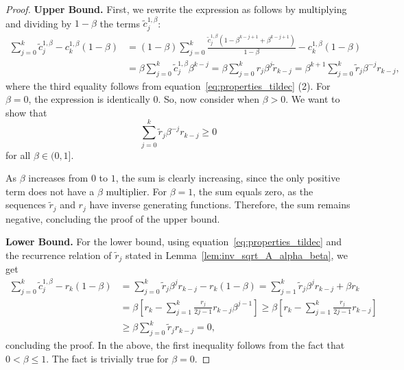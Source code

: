 \documentclass{article} %
\renewcommand{\paragraph}[1]{\noindent\textbf{#1}\quad}
\begin{document}
\begin{proof}
\paragraph{Upper Bound.} First, we rewrite the expression as follows by multiplying and dividing by $1-\beta$ the terms $\tilde{c}^{1, \beta}_j$:
\begin{equation}
\begin{aligned}
     \sum\limits_{j =0}^{k} \tilde{c}^{1, \beta}_j - c_k^{1, \beta} (1 - \beta) &= (1 -\beta)\sum\limits_{j = 0}^{k}\frac{\tilde{c}^{1, \beta}_j(1 -\beta^{k-j + 1} + \beta^{k - j + 1})}{1 - \beta} -c_k^{1, \beta}(1 - \beta)\\ 
     &= \beta \sum\limits_{j = 0}^{k}\tilde{c}^{1, \beta}_j\beta^{k-j}  =\beta\sum\limits_{j = 0}^{k} r_{j}\beta^{j} \tilde{r}_{k - j} =  \beta^{k + 1}\sum\limits_{j = 0}^{k} \tilde{r}_{j}\beta^{-j} r_{k - j},
\end{aligned}
\end{equation}
where the third equality follows from equation~\ref{eq:properties_tildec} (2). For $\beta=0$, the expression is identically $0$. So, now consider when $\beta>0$.  
We want to show that 
\begin{equation}
\sum\limits_{j = 0}^{k} \tilde{r}_{j}\beta^{-j} r_{k - j} \geq 0
\end{equation}
for all $\beta \in (0,1]$.


As $\beta$ increases from $0$ to $1$, the sum is clearly increasing, since the only positive term does not have a $\beta$ multiplier. For $\beta = 1$, the sum equals zero, as the sequences $\tilde{r}_j$ and $r_j$ have inverse generating functions. Therefore, the sum remains negative, concluding the proof of the upper bound.

\paragraph{Lower Bound.} For the lower bound, using equation~\eqref{eq:properties_tildec} and the recurrence relation of $\tilde r_j$ stated in Lemma~\ref{lem:inv_sqrt_A_alpha_beta}, we get 
\begin{equation}
\begin{aligned}
    \sum\limits_{j =0}^{k} \tilde{c}^{1, \beta}_j - r_k (1 - \beta) &= \sum\limits_{j = 0}^{k }\tilde{r}_j \beta^j r_{k - j} - r_k(1 - \beta)  = \sum\limits_{j = 1}^{k }\tilde{r}_j \beta^j r_{k - j} + \beta r_k \\
    &=\beta \left[r_k - \sum\limits_{j = 1}^{k}\frac{r_j}{2j - 1} r_{k - j}\beta^{j - 1}\right] \ge \beta \left[r_k - \sum\limits_{j = 1}^{k}\frac{r_j}{2j - 1} r_{k - j}\right]\\
    &\ge \beta \sum\limits_{j = 0}^{k}\tilde{r}_j r_{k - j} = 0,
\end{aligned}
\end{equation}
concluding the proof. In the above, the first inequality follows from the fact that $0<\beta\leq 1$. The fact is trivially true for $\beta=0$.
\end{proof}
\end{document}

